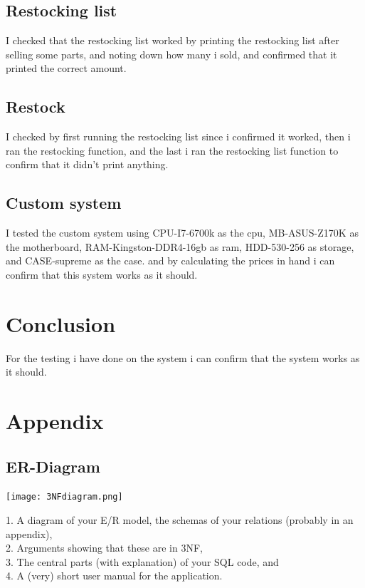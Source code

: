 \documentclass[a4paper,10pt,titlepage]{report}
\begin{document}
\subsection{Restocking list}
I checked that the restocking list worked by printing the restocking list after selling some parts, and noting down how many i sold, and confirmed that it printed the correct amount.
\\
\vspace{5 mm}
\subsection{Restock}
I checked by first running the restocking list since i confirmed it worked, then i ran the restocking function, and the last i ran the restocking list function to confirm that it didn't print anything.
\\
\vspace{5 mm}
\subsection{Custom system}
I tested the custom system using CPU-I7-6700k as the cpu, MB-ASUS-Z170K as the motherboard, RAM-Kingston-DDR4-16gb as ram, HDD-530-256 as storage, and CASE-supreme as the case. 
and by calculating the prices in hand i can confirm that this system works as it should.

\section{Conclusion}
For the testing i have done on the system i can confirm that the system works as it should.
\section{Appendix}
\subsection{ER-Diagram}

\texttt{[image: 3NFdiagram.png]}

1. A diagram of your E/R model, the schemas of your relations 
(probably in an appendix),\\
2. Arguments showing that these are in 3NF, \\
3. The central parts (with explanation) of your SQL code, and \\
4. A (very) short user manual for the application. \\
\end{document}
